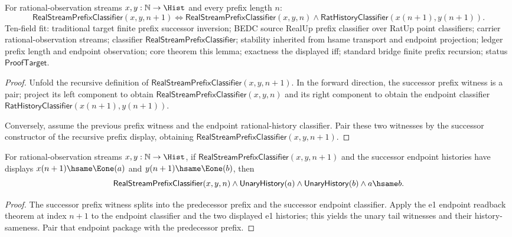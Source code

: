 \begin{lemma}
\label{lem:real-stream-prefix-successor-inversion}
For rational-observation streams $x,y:\mathbb{N}\to\Hist$ and every prefix
length $n$:
$$
\mathsf{RealStreamPrefixClassifier}(x,y,n+1)
\Longleftrightarrow
\mathsf{RealStreamPrefixClassifier}(x,y,n)\land
\mathsf{RatHistoryClassifier}(x(n+1),y(n+1)).
$$
Ten-field fit: traditional target finite prefix successor inversion; BEDC source
RealUp prefix classifier over RatUp point classifiers; carrier
rational-observation streams; classifier $\mathsf{RealStreamPrefixClassifier}$;
stability inherited from hsame transport and endpoint projection; ledger prefix
length and endpoint observation; core theorem this lemma; exactness the
displayed iff; standard bridge finite prefix recursion; status
$\mathsf{ProofTarget}$.
\end{lemma}
\begin{proof}
Unfold the recursive definition of
$\mathsf{RealStreamPrefixClassifier}(x,y,n+1)$. In the forward direction, the
successor prefix witness is a pair; project its left component to obtain
$\mathsf{RealStreamPrefixClassifier}(x,y,n)$ and its right component to obtain
the endpoint classifier
$\mathsf{RatHistoryClassifier}(x(n+1),y(n+1))$.

Conversely, assume the previous prefix witness and the endpoint rational-history
classifier. Pair these two witnesses by the successor constructor of the
recursive prefix display, obtaining
$\mathsf{RealStreamPrefixClassifier}(x,y,n+1)$.
\end{proof}

\begin{lemma}
\label{lem:real-stream-prefix-successor-e1-endpoint-package}
For rational-observation streams $x,y:\mathbb{N}\to\Hist$, if
$\mathsf{RealStreamPrefixClassifier}(x,y,n+1)$ and the successor endpoint
histories have displays $x(n+1)\hsame\Eone(a)$ and
$y(n+1)\hsame\Eone(b)$, then
$$
\mathsf{RealStreamPrefixClassifier}(x,y,n)\land
\mathsf{UnaryHistory}(a)\land\mathsf{UnaryHistory}(b)\land a\hsame b .
$$
\end{lemma}
\begin{proof}
The successor prefix witness splits into the predecessor prefix and the
successor endpoint classifier. Apply the e1 endpoint readback theorem at
index $n+1$ to the endpoint classifier and the two displayed e1 histories;
this yields the unary tail witnesses and their history-sameness. Pair that
endpoint package with the predecessor prefix.
\end{proof}

